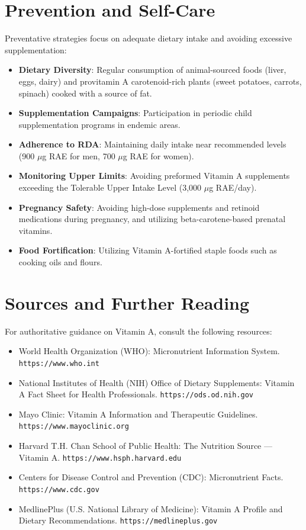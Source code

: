 \section*{Prevention and Self-Care}
Preventative strategies focus on adequate dietary intake and avoiding excessive supplementation:
\begin{itemize}
    \item \textbf{Dietary Diversity}: Regular consumption of animal-sourced foods (liver, eggs, dairy) and provitamin A carotenoid-rich plants (sweet potatoes, carrots, spinach) cooked with a source of fat.
    \item \textbf{Supplementation Campaigns}: Participation in periodic child supplementation programs in endemic areas.
    \item \textbf{Adherence to RDA}: Maintaining daily intake near recommended levels (900 $\mu$g RAE for men, 700 $\mu$g RAE for women).
    \item \textbf{Monitoring Upper Limits}: Avoiding preformed Vitamin A supplements exceeding the Tolerable Upper Intake Level (3,000 $\mu$g RAE/day).
    \item \textbf{Pregnancy Safety}: Avoiding high-dose supplements and retinoid medications during pregnancy, and utilizing beta-carotene-based prenatal vitamins.
    \item \textbf{Food Fortification}: Utilizing Vitamin A-fortified staple foods such as cooking oils and flours.
\end{itemize}

\section*{Sources and Further Reading}
For authoritative guidance on Vitamin A, consult the following resources:
\begin{itemize}
    \item World Health Organization (WHO): Micronutrient Information System. \texttt{https://www.who.int}
    \item National Institutes of Health (NIH) Office of Dietary Supplements: Vitamin A Fact Sheet for Health Professionals. \texttt{https://ods.od.nih.gov}
    \item Mayo Clinic: Vitamin A Information and Therapeutic Guidelines. \texttt{https://www.mayoclinic.org}
    \item Harvard T.H. Chan School of Public Health: The Nutrition Source --- Vitamin A. \texttt{https://www.hsph.harvard.edu}
    \item Centers for Disease Control and Prevention (CDC): Micronutrient Facts. \texttt{https://www.cdc.gov}
    \item MedlinePlus (U.S. National Library of Medicine): Vitamin A Profile and Dietary Recommendations. \texttt{https://medlineplus.gov}
\end{itemize}